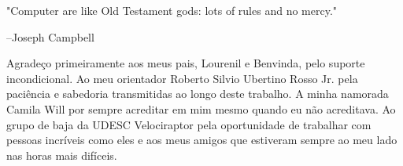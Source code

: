 
\bacharelado {}
\data {\today}





\newpage
\pagestyle{empty}

\maketitle
 \begin{epigrafe}
\noindent "Computer are like Old Testament gods: lots of rules and no mercy."

--Joseph Campbell
\end{epigrafe}

Agradeço primeiramente aos meus pais, Lourenil e Benvinda, pelo suporte incondicional. Ao meu orientador Roberto Silvio Ubertino Rosso Jr. pela paciência e sabedoria transmitidas ao longo deste trabalho. A minha namorada Camila Will por sempre acreditar em mim mesmo quando eu não acreditava. Ao grupo de baja da UDESC Velociraptor pela oportunidade de trabalhar com pessoas incríveis como eles e aos meus amigos que estiveram sempre ao meu lado nas horas mais difíceis.   
